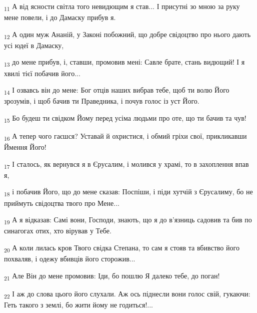 \begin{tcolorbox}
\textsubscript{11} А від ясности світла того невидющим я став... І присутні зо мною за руку мене повели, і до Дамаску прибув я.
\end{tcolorbox}
\begin{tcolorbox}
\textsubscript{12} А один муж Ананій, у Законі побожний, що добре свідоцтво про нього дають усі юдеї в Дамаску,
\end{tcolorbox}
\begin{tcolorbox}
\textsubscript{13} до мене прибув, і, ставши, промовив мені: Савле брате, стань видющий! І я хвилі тієї побачив його...
\end{tcolorbox}
\begin{tcolorbox}
\textsubscript{14} І озвавсь він до мене: Бог отців наших вибрав тебе, щоб ти волю Його зрозумів, і щоб бачив ти Праведника, і почув голос із уст Його.
\end{tcolorbox}
\begin{tcolorbox}
\textsubscript{15} Бо будеш ти свідком Йому перед усіма людьми про оте, що ти бачив та чув!
\end{tcolorbox}
\begin{tcolorbox}
\textsubscript{16} А тепер чого гаєшся? Уставай й охристися, і обмий гріхи свої, прикликавши Ймення Його!
\end{tcolorbox}
\begin{tcolorbox}
\textsubscript{17} І сталось, як вернувся я в Єрусалим, і молився у храмі, то в захоплення впав я,
\end{tcolorbox}
\begin{tcolorbox}
\textsubscript{18} і побачив Його, що до мене сказав: Поспіши, і піди хутчій з Єрусалиму, бо не приймуть свідоцтва твого про Мене...
\end{tcolorbox}
\begin{tcolorbox}
\textsubscript{19} А я відказав: Самі вони, Господи, знають, що я до в'язниць садовив та бив по синагогах отих, хто вірував у Тебе.
\end{tcolorbox}
\begin{tcolorbox}
\textsubscript{20} А коли лилась кров Твого свідка Степана, то сам я стояв та вбивство його похваляв, і одежу вбивців його сторожив...
\end{tcolorbox}
\begin{tcolorbox}
\textsubscript{21} Але Він до мене промовив: Іди, бо пошлю Я далеко тебе, до поган!
\end{tcolorbox}
\begin{tcolorbox}
\textsubscript{22} І аж до слова цього його слухали. Аж ось піднесли вони голос свій, гукаючи: Геть такого з землі, бо жити йому не годиться!...
\end{tcolorbox}
